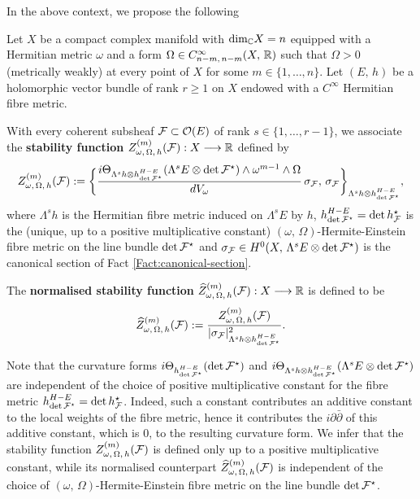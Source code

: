 \documentclass[12pt]{article}
\begin{document}
\vspace{2ex}

In the above context, we propose the following

\begin{Def}\label{Def:Z-function} Let $X$ be a compact complex manifold with $\mbox{dim}_{\mathbb{C}} X =n$ equipped with a Hermitian metric $\omega$ and a form $\Omega\in C^\infty_{n-m,\,n-m}(X,\,\mathbb{R})$ such that $\Omega>0$ (metrically weakly) at every point of $X$ for some $m\in\{1,\dots , n\}$. Let $(E,\,h)$ be a holomorphic vector bundle of rank $r\geq 1$ on $X$ endowed with a $C^\infty$ Hermitian fibre metric.

  With every coherent subsheaf ${\cal F}\subset{\cal O}(E)$ of rank $s\in\{1,\dots , r-1\}$, we associate the {\bf stability function} $Z_{\omega,\,\Omega,\,h}^{(m)}({\cal F}):X\longrightarrow\mathbb{R}$ defined by \begin{eqnarray*}Z_{\omega,\,\Omega,\,h}^{(m)}({\cal F}):=\bigg\{\frac{i\Theta_{\Lambda^sh\otimes h^{H-E}_{\det{\cal F}^\star}}(\Lambda^s E\otimes\det{\cal F}^\star)\wedge\omega^{m-1}\wedge\Omega}{dV_\omega}\,\sigma_{{\cal F}},\,\sigma_{{\cal F}}\bigg\}_{\Lambda^sh\otimes h^{H-E}_{\det{\cal F}^\star}},\end{eqnarray*} where $\Lambda^sh$ is the Hermitian fibre metric induced on $\Lambda^s E$ by $h$, $h^{H-E}_{\det{\cal F}^\star} = \det h_{{\cal F}}^\star$ is the (unique, up to a positive multiplicative constant) $(\omega,\,\Omega)$-Hermite-Einstein fibre metric on the line bundle $\det{\cal F}^\star$ and $\sigma_{{\cal F}}\in H^0(X,\,\Lambda^s E\otimes\det{\cal F}^\star)$ is the canonical section of Fact \ref{Fact:canonical-section}.

  The {\bf normalised stability function} $\widehat{Z}_{\omega,\,\Omega,\,h}^{(m)}({\cal F}):X\longrightarrow\mathbb{R}$ is defined to be \begin{eqnarray*}\widehat{Z}_{\omega,\,\Omega,\,h}^{(m)}({\cal F}):= \frac{Z_{\omega,\,\Omega,\,h}^{(m)}({\cal F})}{|\sigma_{{\cal F}}|^2_{\Lambda^sh\otimes h^{H-E}_{\det{\cal F}^\star}}}.\end{eqnarray*}

\end{Def}  

Note that the curvature forms $i\Theta_{h^{H-E}_{\det{\cal F}^\star}}(\det{\cal F}^\star)$ and $i\Theta_{\Lambda^sh\otimes h^{H-E}_{\det{\cal F}^\star}}(\Lambda^s E\otimes\det{\cal F}^\star)$ are independent of the choice of positive multiplicative constant for the fibre metric $h^{H-E}_{\det{\cal F}^\star} = \det h_{{\cal F}}^\star$. Indeed, such a constant contributes an additive constant to the local weights of the fibre metric, hence it contributes the $i\partial\bar\partial$ of this additive constant, which is 0, to the resulting curvature form. We infer that the stability function $Z_{\omega,\,\Omega,\,h}^{(m)}({\cal F})$ is defined only up to a positive multiplicative constant, while its normalised counterpart $\widehat{Z}_{\omega,\,\Omega,\,h}^{(m)}({\cal F})$ is independent of the choice of $(\omega,\,\Omega)$-Hermite-Einstein fibre metric on the line bundle $\det{\cal F}^\star$.
\end{document}
